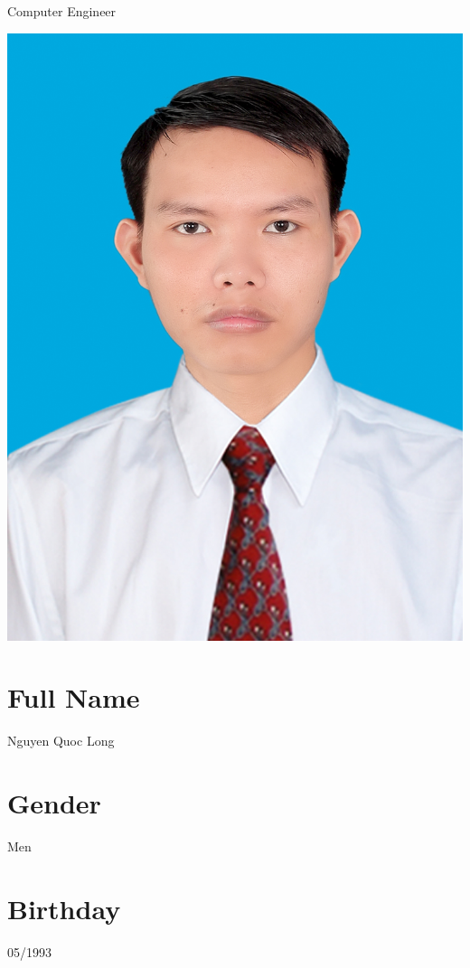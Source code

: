 \documentclass[]{friggeri-cv}
\begin{document}
      {Computer Engineer}
      


\begin{aside}
  \includegraphics[scale=0.35]{img/long.JPG}
  \section{Full Name}
Nguyen Quoc Long
  \section{Gender}
Men
  \section{Birthday}
05/1993
~
~
~
~

\end{aside}
\end{document}
